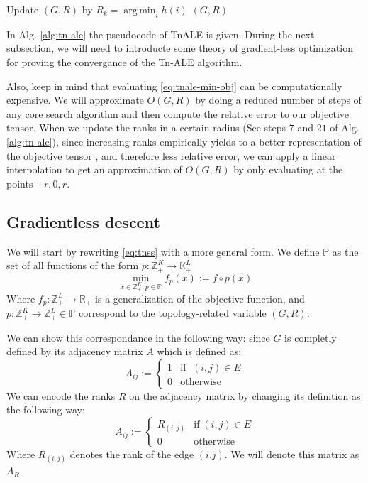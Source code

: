 \documentclass[11pt,a4paper,openright,oneside]{book}
\numberwithin{equation}{section}
\DeclareMathOperator*{\argmin}{arg\,min}
\begin{document}
{\begin{algorithm}[h]
\begin{algorithmic}[1]
                \EndFor
                \State Update $(G, R)$ by $R_k = \argmin_i h(i)$
            \EndFor
        \EndFor
        \State \Return $(G, R)$

    \end{algorithmic}

    \label{alg:tn-ale}
\end{algorithm}

In Alg. \ref{alg:tn-ale} the pseudocode of TnALE is given. During the next subsection, we will need to introducte some theory of
gradient-less optimization for proving the convergance of the Tn-ALE algorithm.

Also, keep in mind that evaluating \eqref{eq:tnale-min-obj} can be computationally expensive. We will 
approximate $O(G, R)$ by doing a reduced number of steps of any core search algorithm and then compute the relative error
to our objective tensor. When we update the ranks in a certain radius (See
steps $7$ and $21$ of Alg. \ref{alg:tn-ale}), since increasing ranks empirically yields 
to a better representation of the objective tensor \cite{liAlternatingLocalEnumeration2023}, and therefore less relative error,
we can apply a linear interpolation to get an approximation of $O(G, R)$ by only evaluating at the points $-r, 0, r$.

\subsection{Gradientless descent}

We will start by rewriting \eqref{eq:tnss} with a more general form. We define $\mathbb{P}$ as the
set of all functions of the form $p : \mathbb{Z}_+^K \rightarrow \mathbb{K}_+^L$
\begin{equation}
\min_{x \in \mathbb{Z}_+^K, p \in \mathbb{P}} f_p(x) := f \circ p(x)
\label{eq:min_grad}
\end{equation}
Where $f_p : \mathbb{Z}_+^L \rightarrow \mathbb{R}_+$ is a generalization of the objective function, and $p : \mathbb{Z}_+^K \rightarrow \mathbb{Z}_+^L \in \mathbb{P}$
correspond to the topology-related variable $(G, R)$.

We can show this correspondance in the following way: since $G$ is completly defined by its adjacency matrix $A$ which is defined as:
$$A_{ij} := \begin{cases}
    1 & \text{if }\;(i, j) \in E \\
    0 & \text{otherwise}
\end{cases}$$
We can encode the ranks $R$ on the adjacency matrix by changing its definition as the following way:
$$A_{ij} := \begin{cases}
    R_{(i,j)} & \text{if}\;(i, j) \in E \\
    0 & \text{otherwise}
\end{cases}$$
Where $R_{(i,j)}$ denotes the rank of the edge $(i.j)$. We will denote this matrix as $A_R$

}
\end{document}
